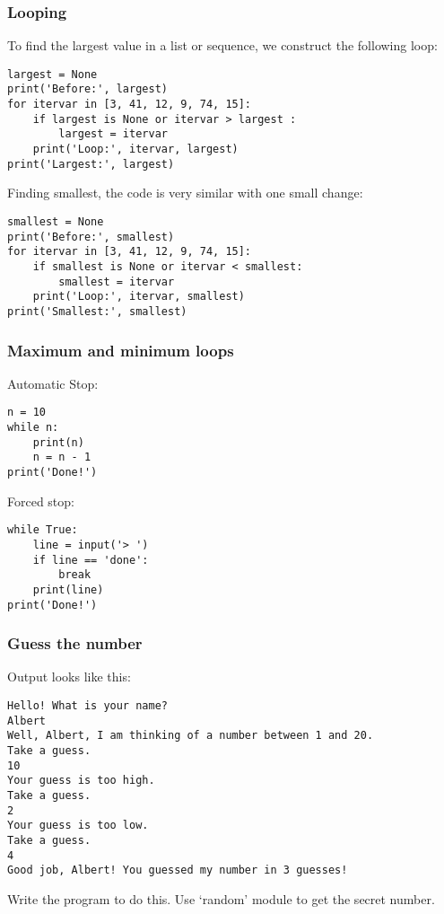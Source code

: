 \begin{frame}[fragile]\frametitle{Looping}
To find the largest value in a list or sequence, we construct the following loop:
\begin{lstlisting}
largest = None
print('Before:', largest)
for itervar in [3, 41, 12, 9, 74, 15]:
	if largest is None or itervar > largest :
		largest = itervar
	print('Loop:', itervar, largest)
print('Largest:', largest)
\end{lstlisting}
Finding smallest, the code is very similar with one small change:
\begin{lstlisting}
smallest = None
print('Before:', smallest)
for itervar in [3, 41, 12, 9, 74, 15]:
	if smallest is None or itervar < smallest:
		smallest = itervar
	print('Loop:', itervar, smallest)
print('Smallest:', smallest)
\end{lstlisting}
\end{frame}

\begin{frame}[fragile]\frametitle{Maximum and minimum loops}
Automatic Stop:
\begin{lstlisting}
n = 10
while n:
	print(n)
	n = n - 1
print('Done!')
\end{lstlisting}
Forced stop:
\begin{lstlisting}
while True:
	line = input('> ')
	if line == 'done':
		break
	print(line)
print('Done!')
\end{lstlisting}
\end{frame}

\begin{frame}[fragile]\frametitle{Guess the number}

Output looks like this:
\begin{lstlisting}
Hello! What is your name?
Albert
Well, Albert, I am thinking of a number between 1 and 20.
Take a guess.
10
Your guess is too high.
Take a guess.
2
Your guess is too low.
Take a guess.
4
Good job, Albert! You guessed my number in 3 guesses!
\end{lstlisting}
Write the program to do this. Use `random' module to get the secret number.
\end{frame}


